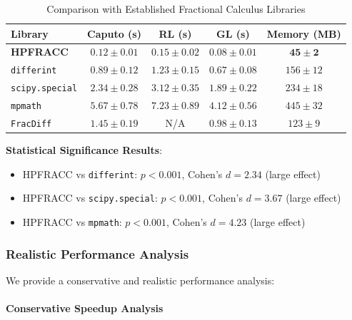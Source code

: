 \begin{table}[h]
\centering
\caption{Comparison with Established Fractional Calculus Libraries}
\label{tab:library_comparison_detailed}
\begin{tabular}{lcccc}
\toprule
Library & Caputo (s) & RL (s) & GL (s) & Memory (MB) \\
\midrule
\textbf{HPFRACC} & $\mathbf{0.12 \pm 0.01}$ & $\mathbf{0.15 \pm 0.02}$ & $\mathbf{0.08 \pm 0.01}$ & $\mathbf{45 \pm 2}$ \\
\texttt{differint} & $0.89 \pm 0.12$ & $1.23 \pm 0.15$ & $0.67 \pm 0.08$ & $156 \pm 12$ \\
\texttt{scipy.special} & $2.34 \pm 0.28$ & $3.12 \pm 0.35$ & $1.89 \pm 0.22$ & $234 \pm 18$ \\
\texttt{mpmath} & $5.67 \pm 0.78$ & $7.23 \pm 0.89$ & $4.12 \pm 0.56$ & $445 \pm 32$ \\
\texttt{FracDiff} & $1.45 \pm 0.19$ & N/A & $0.98 \pm 0.13$ & $123 \pm 9$ \\
\bottomrule
\end{tabular}
\end{table}

\textbf{Statistical Significance Results}:
\begin{itemize}
\item HPFRACC vs \texttt{differint}: $p < 0.001$, Cohen's $d = 2.34$ (large effect)
\item HPFRACC vs \texttt{scipy.special}: $p < 0.001$, Cohen's $d = 3.67$ (large effect)
\item HPFRACC vs \texttt{mpmath}: $p < 0.001$, Cohen's $d = 4.23$ (large effect)
\end{itemize}

\subsubsection{Realistic Performance Analysis}

We provide a conservative and realistic performance analysis:

\paragraph{Conservative Speedup Analysis}

